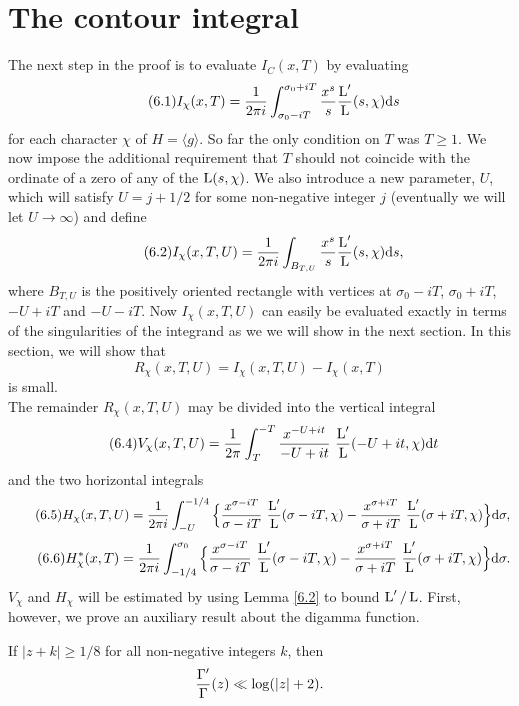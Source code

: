 \documentclass[./main]{subfiles}
\begin{document}
\section{The contour integral}\label{6}
The next step in the proof is to evaluate $I_C(x,T)$ by evaluating 
\[\tag{6.1}\label{(6.1)}I_{\chi}(x,T) = \frac{1}{2\pi i} \int_{\sigma_{0}-iT}^{\sigma_{0}+iT} \frac{x^s}{s}\frac{\operatorname{L}'}{\operatorname{L}}(s, \chi) \mathrm{d}{s}
\]
for each character $\chi$ of $H = \langle g \rangle$. So far the only condition on $T$ was $T \geq 1$. We now impose the additional requirement that $T$ should not coincide with the ordinate of a zero of any of the $\operatorname{L}(s, \chi)$. We also introduce a new parameter, $U$, which will satisfy $U = j + 1/2$ for some non-negative integer $j$ (eventually we will let $U \to \infty$) and define 
\[\tag{6.2}\label{(6.2)}I_{\chi}(x,T,U) = \frac{1}{2\pi i}\int_{B_{T,U}} \frac{x^s}{s} \frac{\operatorname{L}'}{\operatorname{L}}(s, \chi) \mathrm{d}{s},
\]
where $B_{T,U}$ is the positively oriented rectangle with vertices at $\sigma_{0}-iT$, $\sigma_{0} + iT$, $-U + iT$ and $-U - iT$. Now $I_{\chi}(x,T,U)$ can easily be evaluated exactly in terms of the singularities of the integrand as we we will show in the next section. In this section, we will show that 
\[\tag{6.3}\label{(6.3)} R_{\chi}(x,T,U) = I_{\chi}(x,T,U) - I_{\chi}(x,T)
\]
is small.\\
The remainder $R_{\chi}(x,T,U)$ may be divided into the vertical integral 
\[\tag{6.4}\label{(6.4)} V_{\chi}(x,T,U) = \frac{1}{2\pi} \int_{T}^{-T} \frac{x^{-U+it}}{-U+it}\,\, \frac{\operatorname{L}'}{\operatorname{L}}(-U+it, \chi) \mathrm{d}{t}
\]
and the two horizontal integrals
\[\tag{6.5}\label{(6.5)} H_{\chi}(x,T,U) = \frac{1}{2\pi i} \int_{-U}^{-1/4}\Big\{ \frac{x^{\sigma - iT}}{\sigma - iT}\,\, \frac{\operatorname{L}'}{\operatorname{L}}(\sigma - iT, \chi) - \frac{x^{\sigma + iT}}{\sigma + iT} \,\,\frac{\operatorname{L}'}{\operatorname{L}}(\sigma + iT, \chi)\Big\} \mathrm{d}{\sigma},
\]
\[\tag{6.6}\label{(6.6)} H_{\chi}^{*}(x,T) = \frac{1}{2\pi i}\int_{-1/4}^{\sigma_{0}} \Big\{\frac{x^{\sigma - iT}}{\sigma - iT}\,\, \frac{\operatorname{L}'}{\operatorname{L}}(\sigma - iT, \chi) - \frac{x^{\sigma + iT}}{\sigma + iT}\,\, \frac{\operatorname{L}'}{\operatorname{L}}(\sigma + iT, \chi)\Big\} \mathrm{d}{\sigma}. \]
$V_{\chi}$ and $H_{\chi}$ will be estimated by using Lemma \ref{6.2} to bound $\operatorname{L}'/\operatorname{L}$. First, however, we prove an auxiliary result about the digamma function.
\begin{lemma} \label{6.1}
If $|z + k | \geq 1/8$ for all non-negative integers $k$, then 
\[\frac{\Gamma'}{\Gamma}(z) \ll \log(|z| + 2)
.\]
\end{lemma}
\end{document}
